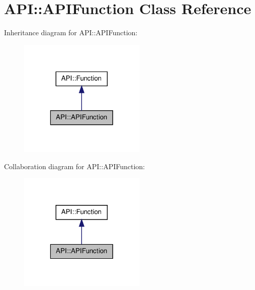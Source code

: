 \hypertarget{class_a_p_i_1_1_a_p_i_function}{\section{A\-P\-I\-:\-:A\-P\-I\-Function Class Reference}
\label{class_a_p_i_1_1_a_p_i_function}
}


Inheritance diagram for A\-P\-I\-:\-:A\-P\-I\-Function\-:\nopagebreak
\begin{figure}[H]
\begin{center}
\leavevmode
\includegraphics[width=172pt]{class_a_p_i_1_1_a_p_i_function__inherit__graph}
\end{center}
\end{figure}


Collaboration diagram for A\-P\-I\-:\-:A\-P\-I\-Function\-:\nopagebreak
\begin{figure}[H]
\begin{center}
\leavevmode
\includegraphics[width=172pt]{class_a_p_i_1_1_a_p_i_function__coll__graph}
\end{center}
\end{figure}
